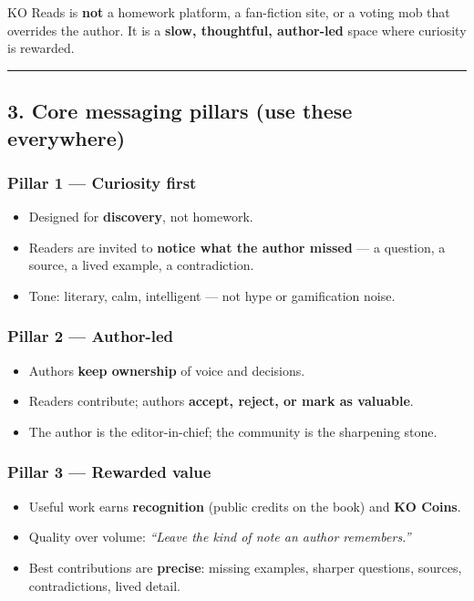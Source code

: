 \documentclass[11pt,a4paper]{report}
\begin{document}
KO Reads is \textbf{not} a homework platform, a fan-fiction site, or a voting mob that overrides the author. It is a \textbf{slow, thoughtful, author-led} space where curiosity is rewarded.


\medskip\hrule\medskip

\subsection{3. Core messaging pillars (use these everywhere)}

\subsubsection{Pillar 1 --- Curiosity first}
\begin{itemize}
  \item Designed for \textbf{discovery}, not homework.
  \item Readers are invited to \textbf{notice what the author missed} --- a question, a source, a lived example, a contradiction.
  \item Tone: literary, calm, intelligent --- not hype or gamification noise.
\end{itemize}

\subsubsection{Pillar 2 --- Author-led}
\begin{itemize}
  \item Authors \textbf{keep ownership} of voice and decisions.
  \item Readers contribute; authors \textbf{accept, reject, or mark as valuable}.
  \item The author is the editor-in-chief; the community is the sharpening stone.
\end{itemize}

\subsubsection{Pillar 3 --- Rewarded value}
\begin{itemize}
  \item Useful work earns \textbf{recognition} (public credits on the book) and \textbf{KO Coins}.
  \item Quality over volume: \textit{“Leave the kind of note an author remembers.”}
  \item Best contributions are \textbf{precise}: missing examples, sharper questions, sources, contradictions, lived detail.
\end{itemize}
\end{document}
